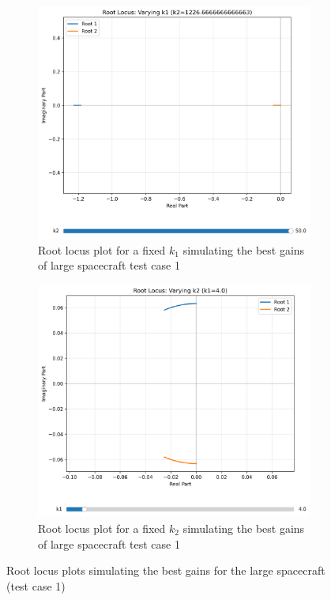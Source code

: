 \documentclass{ifacconf}
\begin{document}
\begin{figure}[H]
    \centering
    \begin{subfigure}[b]{0.48\columnwidth}
        \centering
        \includegraphics[width=\linewidth]{best_gains/root_locus/best_k1_root_locus(1).pdf}
        \caption{Root locus plot for a fixed $k_1$ simulating the best gains of large spacecraft test case 1}
        \label{fig:subfig1}
    \end{subfigure}
    \hfill
    \begin{subfigure}[b]{0.48\columnwidth}
        \centering
        \includegraphics[width=\linewidth]{root_locus/base_k2_root_locus(1).pdf}
        \caption{Root locus plot for a fixed $k_2$ simulating the best gains of large spacecraft test case 1}
        \label{fig:subfig2}
    \end{subfigure}
    \caption{Root locus plots simulating the best gains for the large spacecraft (test case 1)}
    \label{fig:combined}
\end{figure}
\end{document}
